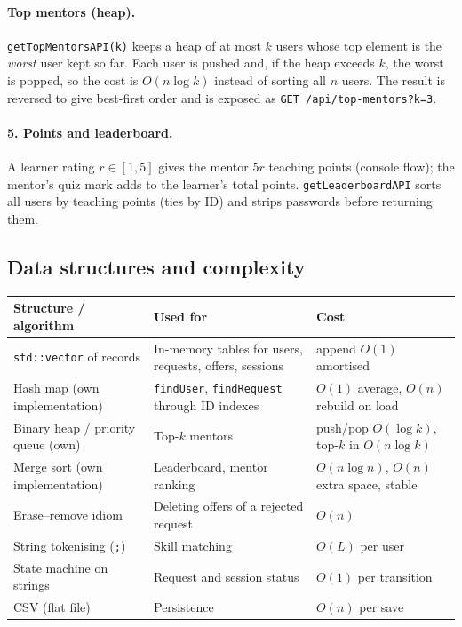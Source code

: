 \documentclass[11pt,a4paper]{article}
\begin{document}
\paragraph{Top mentors (heap).} \texttt{getTopMentorsAPI(k)} keeps a heap of at most $k$ users whose top element is the \emph{worst} user kept so far. Each user is pushed and, if the heap exceeds $k$, the worst is popped, so the cost is $O(n\log k)$ instead of sorting all $n$ users. The result is reversed to give best-first order and is exposed as \texttt{GET /api/top-mentors?k=3}.

\paragraph{5. Points and leaderboard.} A learner rating $r\in[1,5]$ gives the mentor $5r$ teaching points (console flow); the mentor's quiz mark adds to the learner's total points. \texttt{getLeaderboardAPI} sorts all users by teaching points (ties by ID) and strips passwords before returning them.

\subsection{Data structures and complexity}

\begin{center}\begin{tabular}{p{3.8cm}p{5.2cm}p{4.2cm}}\toprule
Structure / algorithm & Used for & Cost\\\midrule
\texttt{std::vector} of records & In-memory tables for users, requests, offers, sessions & append $O(1)$ amortised\\
Hash map (own implementation) & \texttt{findUser}, \texttt{findRequest} through ID indexes & $O(1)$ average, $O(n)$ rebuild on load\\
Binary heap / priority queue (own) & Top-$k$ mentors & push/pop $O(\log k)$, top-$k$ in $O(n\log k)$\\
Merge sort (own implementation) & Leaderboard, mentor ranking & $O(n\log n)$, $O(n)$ extra space, stable\\
Erase--remove idiom & Deleting offers of a rejected request & $O(n)$\\
String tokenising (\texttt{;}) & Skill matching & $O(L)$ per user\\
State machine on strings & Request and session status & $O(1)$ per transition\\
CSV (flat file) & Persistence & $O(n)$ per save\\\bottomrule
\end{tabular}\end{center}
\end{document}
